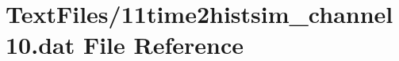 \hypertarget{11time2histsim__channel10_8dat}{}\section{Text\+Files/11time2histsim\+\_\+channel10.dat File Reference}
\label{11time2histsim__channel10_8dat}
